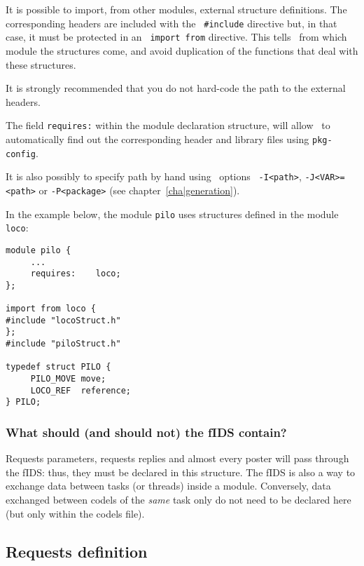 It is  possible to   import,  from  other  modules, external    structure
definitions. The corresponding headers are included with the {\tt
\#include} directive but, in that case, it must be protected in an {\tt
import from}    directive.  This tells \GenoM\     from which module  the
structures come, and  avoid duplication of  the functions that deal  with
these structures.

It is strongly recommended that you do not hard-code the path to the
external headers. 

The field {\tt requires:} within the module declaration structure, will
allow \GenoM\ to automatically find out the corresponding header and
library files using {\tt pkg-config}.

It is also possibly to specify path by hand using \GenoM\ options {\tt
-I<path>}, {\tt -J<VAR>=<path>} or {\tt -P<package>} (see
chapter~\vref{cha|generation}).

In the example  below, the module  {\tt pilo} uses  structures defined in
the module {\tt loco}:

\begin{center}\begin{cartouche}\small\begin{verbatim}
module pilo {
     ...
     requires:    loco;
};

import from loco {
#include "locoStruct.h"
};
#include "piloStruct.h"

typedef struct PILO {
     PILO_MOVE move;
     LOCO_REF  reference;
} PILO;
\end{verbatim}\end{cartouche}\end{center}

\subsubsection{What should (and should not) the fIDS contain?}

Requests parameters, requests replies  and almost every poster  will pass
through the fIDS: thus, they must be declared in this structure. The fIDS
is also a way to   exchange data between tasks    (or threads) inside   a
module. Conversely, data exchanged between codels of  the {\em same} task
only do not need to be declared here (but only within the codels file).


\subsection{Requests definition}

